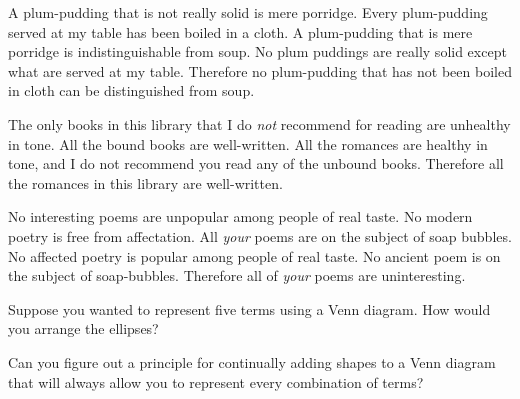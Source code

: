 \begin{exercises}
\item \label{itm:plum-pudding} A plum-pudding that is not really solid is mere porridge. Every plum-pudding served at my table has been boiled in a cloth. A plum-pudding that is mere porridge is indistinguishable from soup. No plum puddings are really solid except what are served at my table. Therefore no plum-pudding that has not been boiled in cloth can be distinguished from soup. %

\item \label{itm:books} The only books in this library that I do \textit{not} recommend for reading are unhealthy in tone. All the bound books are well-written. All the romances are healthy in tone, and I do not recommend you read any of the unbound books. Therefore all the romances in this library are well-written. 

\item \label{itm: poems} No interesting poems are unpopular among people of real taste. No modern poetry is free from affectation. All \textit{your} poems are on the subject of soap bubbles. No affected poetry is popular among people of real taste. No ancient poem is on the subject of soap-bubbles. Therefore all of \textit{your} poems are uninteresting. %

\end{exercises}
                                    
\noindent\problempart
\begin{exercises}
\item Suppose you wanted to represent five terms using a Venn diagram. How would you arrange the ellipses? 
\item Can you figure out a principle for continually adding shapes to a Venn diagram that will always allow you to represent every combination of terms?
\end{exercises}


